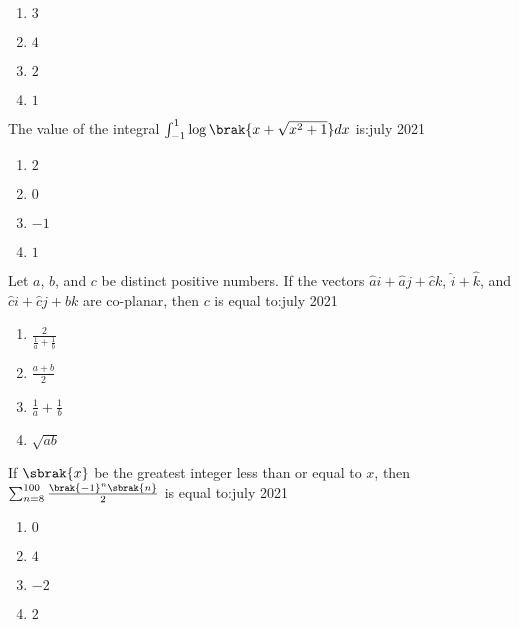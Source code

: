         \begin{multicols}{4}
        \begin{enumerate}
        \item $3$
        \item $4$
        \item $2$
        \item $1$
        \end{enumerate}
        \end{multicols}

    \item The value of the integral $\int_{-1}^{1}\log\brak{x+\sqrt{x^2+1}}dx$ is:\hfill{july 2021}
    
        \begin{multicols}{4}
        \begin{enumerate}
        \item $2$
        \item $0$
        \item $-1$
        \item $1$
        \end{enumerate}
        \end{multicols}

    \item Let $a$, $b$, and $c$ be distinct positive numbers. If the vectors $\hat{a}i+\hat{a}j+\hat{c}k$, $\hat{i}+\hat{k}$, and $\hat{c}i+\hat{c}j+\hat{b}k$ are co-planar, then $c$ is equal to:\hfill{july 2021}
        \begin{multicols}{4}
        \begin{enumerate}
        \item $\frac{2}{\frac{1}{a}+\frac{1}{b}}$
        \item $\frac{a+b}{2}$
        \item $\frac{1}{a}+\frac{1}{b}$
        \item $\sqrt{ab}$
        \end{enumerate}
        \end{multicols}

    \item If $\sbrak{x}$ be the greatest integer less than or equal to $x$, then $\sum_{n=8}^{100}\frac{\brak{-1}^n\sbrak{n}}{2}$ is equal to:\hfill{july 2021}

        \begin{multicols}{4}
        \begin{enumerate}
        \item $0$
        \item $4$
        \item $-2$
        \item $2$
        \end{enumerate}
        \end{multicols}

